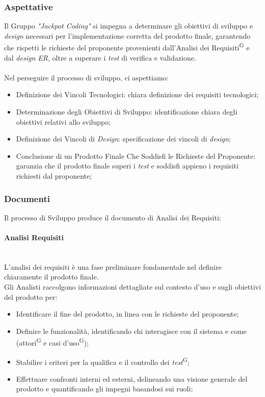\documentclass[5pt]{article}
\begin{document}
\subsubsection{Aspettative}
Il Gruppo \textit{"Jackpot Coding"} si impegna a determinare gli obiettivi di sviluppo e \textit{design} necessari per l'implementazione corretta del prodotto finale, garantendo che rispetti le richieste del proponente provenienti dall'Analisi dei Requisiti\textsuperscript{G} e dal \textit{design ER}, oltre a superare i \textit{test} di verifica e validazione.\\\\
Nel perseguire il processo di sviluppo, ci aspettiamo:
\begin{itemize}
	\item Definizione dei Vincoli Tecnologici: chiara definizione dei requisiti tecnologici;
	\item Determinazione degli Obiettivi di Sviluppo: identificazione chiara degli obiettivi relativi allo sviluppo;
	\item Definizione dei Vincoli di \textit{Design}: specificazione dei vincoli di \textit{design};
	\item Conclusione di un Prodotto Finale Che Soddisfi le Richieste del Proponente: garanzia che il prodotto finale superi i \textit{test} e soddisfi appieno i requisiti richiesti dal proponente;
\end{itemize}

\subsubsection{Documenti}
Il processo di Sviluppo produce il documento di Analisi dei Requisiti:

\paragraph{Analisi Requisiti}~\\

L'analisi dei requisiti è una fase preliminare fondamentale nel definire chiaramente il prodotto finale.\\
Gli Analisti raccolgono informazioni dettagliate sul contesto d'uso e sugli obiettivi del prodotto per:
\begin{itemize}
    \item Identificare il fine del prodotto, in linea con le richieste del proponente;
    \item Definire le funzionalità, identificando chi interagisce con il sistema e come (attori\textsuperscript{G} e casi d'uso\textsuperscript{G});
    \item Stabilire i criteri per la qualifica e il controllo dei \textit{test}\textsuperscript{G};
    \item Effettuare confronti interni ed esterni, delineando una visione generale del prodotto e quantificando gli impegni basandosi sui ruoli;
\end{itemize}
\end{document}
